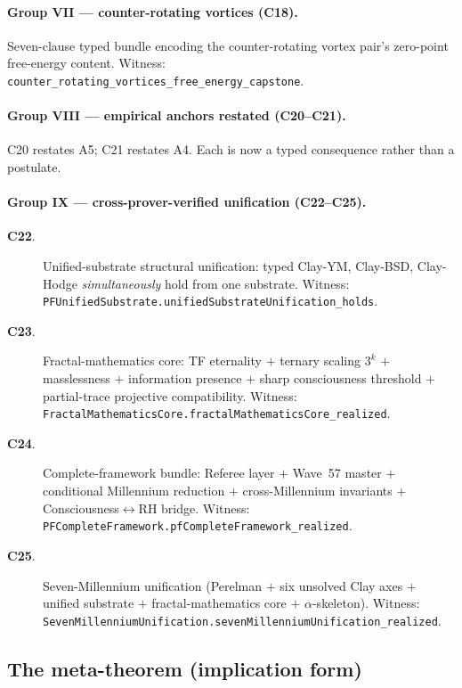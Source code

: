 \documentclass[11pt,a4paper]{article}
\theoremstyle{definition}
\theoremstyle{remark}
\newcommand{\lean}[1]{\texttt{\small #1}}
\begin{document}
\paragraph{Group VII --- counter-rotating vortices (C18).}

Seven-clause typed bundle encoding the counter-rotating vortex pair's
zero-point free-energy content. Witness:
\lean{counter\_rotating\_vortices\_free\_energy\_capstone}.

\paragraph{Group VIII --- empirical anchors restated (C20--C21).}

C20 restates A5; C21 restates A4. Each is now a typed consequence
rather than a postulate.

\paragraph{Group IX --- cross-prover-verified unification (C22--C25).}

\begin{description}
\item[\textbf{C22}.] Unified-substrate structural unification:
typed Clay-YM, Clay-BSD, Clay-Hodge \emph{simultaneously} hold
from one substrate. Witness:
\lean{PFUnifiedSubstrate.unifiedSubstrateUnification\_holds}.
\item[\textbf{C23}.] Fractal-mathematics core: TF eternality $+$
ternary scaling $3^{k}$ $+$ masslessness $+$ information presence
$+$ sharp consciousness threshold $+$ partial-trace projective
compatibility. Witness:
\lean{FractalMathematicsCore.fractalMathematicsCore\_realized}.
\item[\textbf{C24}.] Complete-framework bundle: Referee layer
$+$ Wave~57 master $+$ conditional Millennium reduction $+$
cross-Millennium invariants $+$ Consciousness$\leftrightarrow$RH
bridge. Witness:
\lean{PFCompleteFramework.pfCompleteFramework\_realized}.
\item[\textbf{C25}.] Seven-Millennium unification (Perelman $+$
six unsolved Clay axes $+$ unified substrate $+$
fractal-mathematics core $+$ $\alpha$-skeleton). Witness:
\lean{SevenMillenniumUnification.sevenMillenniumUnification\_realized}.
\end{description}

\subsection{The meta-theorem (implication form)}
\end{document}
